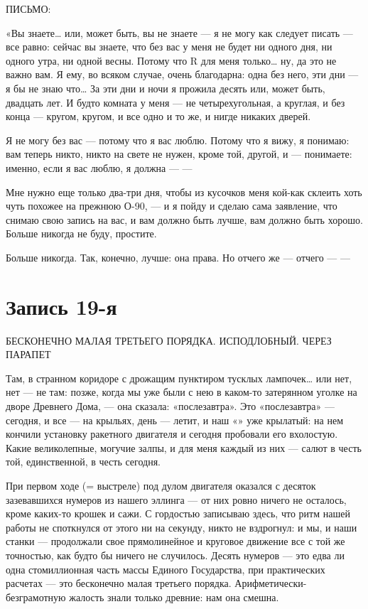 \documentclass[11pt,openany]{book}
\newcommand{\bookchapterplain}[1]{%
  \clearpage\phantomsection\chapter*{#1}%
  \addcontentsline{toc}{chapter}{#1}\markboth{#1}{#1}\thispagestyle{plain}}
\begin{document}
\begin{center}\textsc{ПИСЬМО:}\end{center}

«Вы знаете\ldots{} или, может быть, вы не знаете --- я не могу как следует писать --- все равно: сейчас вы знаете, что без вас у меня не будет ни одного дня, ни одного утра, ни одной весны. Потому что R для меня только\ldots{} ну, да это не важно вам. Я ему, во всяком случае, очень благодарна: одна без него, эти дни --- я бы не знаю что\ldots{} За эти дни и ночи я прожила десять или, может быть, двадцать лет. И будто комната у меня --- не четырехугольная, а круглая, и без конца --- кругом, кругом, и все одно и то же, и нигде никаких дверей.

Я не могу без вас --- потому что я вас люблю. Потому что я вижу, я понимаю: вам теперь никто, никто на свете не нужен, кроме той, другой, и --- понимаете: именно, если я вас люблю, я должна --- ---

Мне нужно еще только два-три дня, чтобы из кусочков меня кой-как склеить хоть чуть похожее на прежнюю О-90, --- и я пойду и сделаю сама заявление, что снимаю свою запись на вас, и вам должно быть лучше, вам должно быть хорошо. Больше никогда не буду, простите.

Больше никогда. Так, конечно, лучше: она права. Но отчего же --- отчего --- ---

\bookchapterplain{Запись 19-я}

\begin{center}\textsc{БЕСКОНЕЧНО МАЛАЯ ТРЕТЬЕГО ПОРЯДКА. ИСПОДЛОБНЫЙ. ЧЕРЕЗ ПАРАПЕТ}\end{center}

Там, в странном коридоре с дрожащим пунктиром тусклых лампочек\ldots{} или нет, нет --- не там: позже, когда мы уже были с нею в каком-то затерянном уголке на дворе Древнего Дома, --- она сказала: «послезавтра». Это «послезавтра» --- сегодня, и все --- на крыльях, день --- летит, и наш «» уже крылатый: на нем кончили установку ракетного двигателя и сегодня пробовали его вхолостую. Какие великолепные, могучие залпы, и для меня каждый из них --- салют в честь той, единственной, в честь сегодня.

При первом ходе (= выстреле) под дулом двигателя оказался с десяток зазевавшихся нумеров из нашего эллинга --- от них ровно ничего не осталось, кроме каких-то крошек и сажи. С гордостью записываю здесь, что ритм нашей работы не споткнулся от этого ни на секунду, никто не вздрогнул: и мы, и наши станки --- продолжали свое прямолинейное и круговое движение все с той же точностью, как будто бы ничего не случилось. Десять нумеров --- это едва ли одна стомиллионная часть массы Единого Государства, при практических расчетах --- это бесконечно малая третьего порядка. Арифметически-безграмотную жалость знали только древние: нам она смешна.
\end{document}
